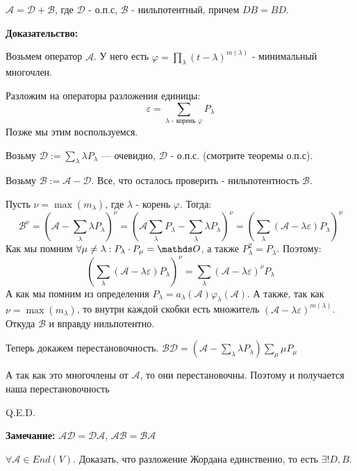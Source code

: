 $\mathcal{A} = \mathcal{D} +\mathcal{B} $, где $\mathcal{D}$ - о.п.с, $\mathcal{B}$ - нильпотентный, причем $DB =BD$.

\textbf{Доказательство:}

Возьмем оператор $\mathcal{A}$. У него есть $\varphi = \prod\limits_{\lambda}(t-\lambda)^{m(\lambda)}$ - минимальный многочлен. 

Разложим на операторы разложения единицы:
$$\varepsilon = \sum\limits_{\lambda\text{ -  корень $\varphi$}}P_{\lambda}$$
Позже мы этим воспользуемся.

Возьму $\mathcal{D}:= \sum\limits_{\lambda}\lambda P_{\lambda}$ --- очевидно, $\mathcal{D}$ - о.п.с. (смотрите теоремы о.п.с).

Возьму $\mathcal{B}:= \mathcal{A}-\mathcal{D}$. Все, что осталось проверить - нильпотентность $\mathcal{B}$.

Пусть $\nu = \max (m_{\lambda})$, где $\lambda$ - корень $\varphi$. Тогда:
$$\mathcal{B}^{\nu} = \left(\mathcal{A}-\sum\limits_{\lambda}\lambda P_\lambda\right)^\nu = \left(\mathcal{A}\sum\limits_{\lambda}P_{\lambda }- \sum\limits_{\lambda}\lambda P_{\lambda}\right)^\nu = \left(\sum\limits_{\lambda}\left(\mathcal{A-\lambda\varepsilon}\right)P_{\lambda}\right)^\nu$$
Как мы помним $\forall \mu\neq \lambda:P_\lambda\cdot P_{\mu}=\zero$, а также $P_{\lambda}^2=P_\lambda$. Поэтому:
$$\left(\sum\limits_{\lambda}\left(\mathcal{A}-\lambda\varepsilon\right)P_{\lambda}\right)^\nu = \sum\limits_{\lambda}\left(\mathcal{A}-\lambda\varepsilon\right)^\nu P_\lambda$$
А как мы помним из определения $P_\lambda = a_\lambda(\mathcal{A})\varphi_\lambda(\mathcal{A})$. А также, так как $\nu = \max(m_\lambda)$, то внутри каждой скобки есть множитель $(\mathcal{A}-\lambda\varepsilon)^{m(\lambda)}$. Откуда $\mathcal{B}$ и вправду нильпотентно.

Теперь докажем перестановочность.
$\mathcal{B}\mathcal{D} = \left(\mathcal{A}-\sum\limits_{\lambda}\lambda P_\lambda\right)\sum\limits_{\mu}\mu P_{\mu}$

А так как это многочлены от $\mathcal{A}$, то они перестановочны.  Поэтому и получается наша перестановочность

 \hfill Q.E.D.
 
\textbf{Замечание:} $\mathcal{A}\mathcal{D} = \mathcal{D} \mathcal{A}$, $\mathcal{A}\mathcal{B} = \mathcal{B} \mathcal{A}$


$\forall \mathcal{A} \in End(V)$. Доказать, что разложение Жордана единственно, то есть $\exists! D, B$.

